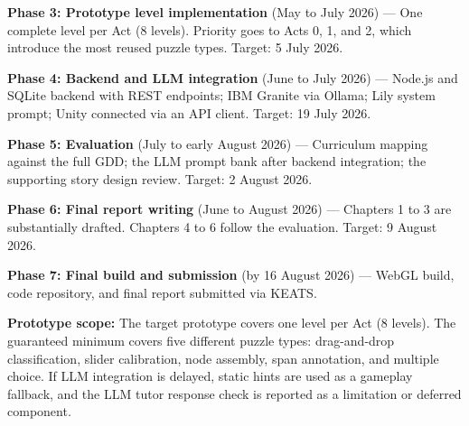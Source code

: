 \documentclass[11pt,a4paper]{article}
\begin{document}
\textbf{Phase 3: Prototype level implementation} (May to July 2026) --- One complete level per Act (8 levels). Priority goes to Acts 0, 1, and 2, which introduce the most reused puzzle types. Target: 5 July 2026.

\textbf{Phase 4: Backend and LLM integration} (June to July 2026) --- Node.js and SQLite backend with REST endpoints; IBM Granite via Ollama; Lily system prompt; Unity connected via an API client. Target: 19 July 2026.

\textbf{Phase 5: Evaluation} (July to early August 2026) --- Curriculum mapping against the full GDD; the LLM prompt bank after backend integration; the supporting story design review. Target: 2 August 2026.

\textbf{Phase 6: Final report writing} (June to August 2026) --- Chapters 1 to 3 are substantially drafted. Chapters 4 to 6 follow the evaluation. Target: 9 August 2026.

\textbf{Phase 7: Final build and submission} (by 16 August 2026) --- WebGL build, code repository, and final report submitted via KEATS.

\textbf{Prototype scope:} The target prototype covers one level per Act (8 levels). The guaranteed minimum covers five different puzzle types: drag-and-drop classification, slider calibration, node assembly, span annotation, and multiple choice. If LLM integration is delayed, static hints are used as a gameplay fallback, and the LLM tutor response check is reported as a limitation or deferred component.
\end{document}
